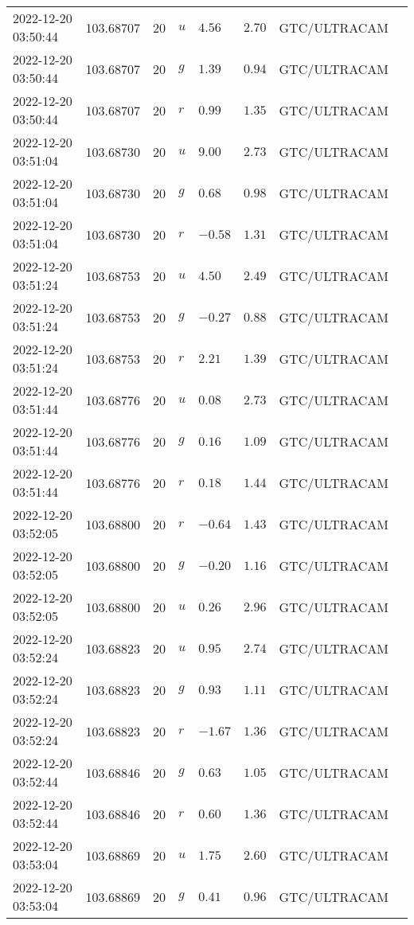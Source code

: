 \documentclass{nature_plusfigure}
\begin{document}
\begin{supplement}
\begin{center}
\begin{longtable}{llllllll}
2022-12-20 03:50:44 & 103.68707 & 20 & $u$ & $4.56$ & $2.70$ & GTC/ULTRACAM &  \\ 
2022-12-20 03:50:44 & 103.68707 & 20 & $g$ & $1.39$ & $0.94$ & GTC/ULTRACAM &  \\ 
2022-12-20 03:50:44 & 103.68707 & 20 & $r$ & $0.99$ & $1.35$ & GTC/ULTRACAM &  \\ 
2022-12-20 03:51:04 & 103.68730 & 20 & $u$ & $9.00$ & $2.73$ & GTC/ULTRACAM &  \\ 
2022-12-20 03:51:04 & 103.68730 & 20 & $g$ & $0.68$ & $0.98$ & GTC/ULTRACAM &  \\ 
2022-12-20 03:51:04 & 103.68730 & 20 & $r$ & $-0.58$ & $1.31$ & GTC/ULTRACAM &  \\ 
2022-12-20 03:51:24 & 103.68753 & 20 & $u$ & $4.50$ & $2.49$ & GTC/ULTRACAM &  \\ 
2022-12-20 03:51:24 & 103.68753 & 20 & $g$ & $-0.27$ & $0.88$ & GTC/ULTRACAM &  \\ 
2022-12-20 03:51:24 & 103.68753 & 20 & $r$ & $2.21$ & $1.39$ & GTC/ULTRACAM &  \\ 
2022-12-20 03:51:44 & 103.68776 & 20 & $u$ & $0.08$ & $2.73$ & GTC/ULTRACAM &  \\ 
2022-12-20 03:51:44 & 103.68776 & 20 & $g$ & $0.16$ & $1.09$ & GTC/ULTRACAM &  \\ 
2022-12-20 03:51:44 & 103.68776 & 20 & $r$ & $0.18$ & $1.44$ & GTC/ULTRACAM &  \\ 
2022-12-20 03:52:05 & 103.68800 & 20 & $r$ & $-0.64$ & $1.43$ & GTC/ULTRACAM &  \\ 
2022-12-20 03:52:05 & 103.68800 & 20 & $g$ & $-0.20$ & $1.16$ & GTC/ULTRACAM &  \\ 
2022-12-20 03:52:05 & 103.68800 & 20 & $u$ & $0.26$ & $2.96$ & GTC/ULTRACAM &  \\ 
2022-12-20 03:52:24 & 103.68823 & 20 & $u$ & $0.95$ & $2.74$ & GTC/ULTRACAM &  \\ 
2022-12-20 03:52:24 & 103.68823 & 20 & $g$ & $0.93$ & $1.11$ & GTC/ULTRACAM &  \\ 
2022-12-20 03:52:24 & 103.68823 & 20 & $r$ & $-1.67$ & $1.36$ & GTC/ULTRACAM &  \\ 
2022-12-20 03:52:44 & 103.68846 & 20 & $g$ & $0.63$ & $1.05$ & GTC/ULTRACAM &  \\ 
2022-12-20 03:52:44 & 103.68846 & 20 & $r$ & $0.60$ & $1.36$ & GTC/ULTRACAM &  \\ 
2022-12-20 03:53:04 & 103.68869 & 20 & $u$ & $1.75$ & $2.60$ & GTC/ULTRACAM &  \\ 
2022-12-20 03:53:04 & 103.68869 & 20 & $g$ & $0.41$ & $0.96$ & GTC/ULTRACAM &  \\ 

\end{longtable}
\end{center}
\end{supplement}
\end{document}
